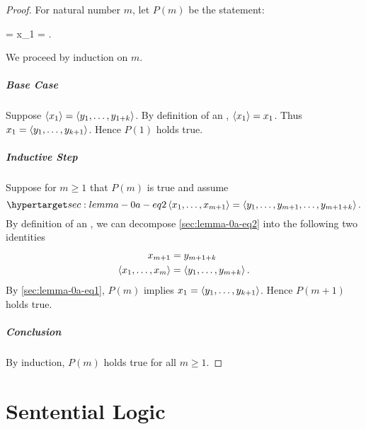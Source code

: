 \documentclass{report}
\begin{document}
  \begin{proof}

    For natural number $m$, let $P(m)$ be the statement:
    \begin{assumption}
        = 
         x_1 = .
    \end{assumption}
    \noindent
    We proceed by induction on $m$.

    \paragraph{Base Case}%

      Suppose $\left< x_1 \right> = \left< y_1, \ldots, y_{1 + k} \right>$.
      By definition of an , $\left< x_1 \right> = x_1$.
      Thus $x_1 = \left< y_1, \ldots, y_{k + 1} \right>$.
      Hence $P(1)$ holds true.

    \paragraph{Inductive Step}%

      Suppose for $m \geq 1$ that $P(m)$ is true and assume
        \begin{equation}
          \hyperlabel{sec:lemma-0a-eq2}
          \ltuple{x_1}{x_{m+1}} = \ltuple{y_1, \ldots, y_{m+1}}{y_{m+1+k}}.
        \end{equation}
      By definition of an , we can decompose
        \eqref{sec:lemma-0a-eq2} into the following two identities
        \begin{align*}
          x_{m+1} & = y_{m+1+k} \\
          \left< x_1, \ldots, x_m \right> & = \left< y_1, \ldots, y_{m+k} \right>.
        \end{align*}
      By \eqref{sec:lemma-0a-eq1}, $P(m)$ implies $x_1 = \left< y_1, \ldots, y_{k+1} \right>$.
      Hence $P(m+1)$ holds true.

    \paragraph{Conclusion}%

      By induction, $P(m)$ holds true for all $m \geq 1$.

  \end{proof}

\chapter{Sentential Logic}%
\end{document}
